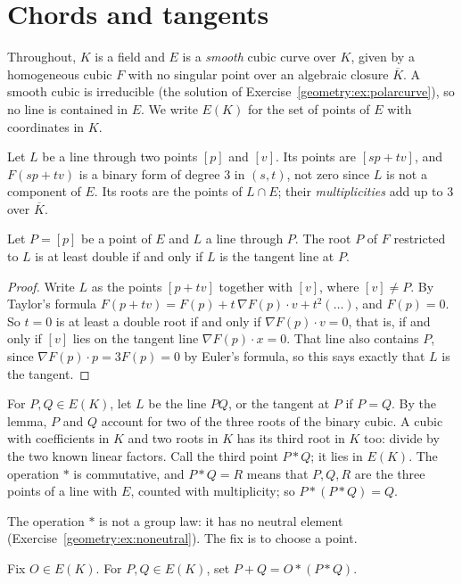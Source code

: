 \section{Chords and tangents}

Throughout, $K$ is a field and $E$ is a \emph{smooth} cubic curve over $K$, given by a homogeneous cubic $F$ with no singular point over an algebraic
closure $\overline K$. A smooth cubic is irreducible (the solution of Exercise~\ref{geometry:ex:polarcurve}), so no line is contained in $E$. We write $E(K)$ for the
set of points of $E$ with coordinates in $K$.

Let $L$ be a line through two points $[p]$ and $[v]$. Its points are $[sp+tv]$, and $F(sp+tv)$ is a binary form of degree $3$ in $(s,t)$, not zero since $L$ is
not a component of $E$. Its roots are the points of $L\cap E$; their \emph{multiplicities} add up to $3$ over $\overline K$.

\begin{lemma}\label{geometry:lem:tangentdouble}
Let $P=[p]$ be a point of $E$ and $L$ a line through $P$. The root $P$ of $F$ restricted to $L$ is at least double if and only if $L$ is the tangent line
at $P$.
\end{lemma}

\begin{proof}
Write $L$ as the points $[p+tv]$ together with $[v]$, where $[v]\ne P$. By Taylor's formula $F(p+tv)=F(p)+t\,\nabla F(p)\cdot v+t^2(\dots)$, and $F(p)=0$.
So $t=0$ is at least a double root if and only if $\nabla F(p)\cdot v=0$, that is, if and only if $[v]$ lies on the tangent line $\nabla F(p)\cdot x=0$.
That line also contains $P$, since $\nabla F(p)\cdot p=3F(p)=0$ by Euler's formula, so this says exactly that $L$ is the tangent.
\end{proof}

For $P,Q\in E(K)$, let $L$ be the line $PQ$, or the tangent at $P$ if $P=Q$. By the lemma, $P$ and $Q$ account for two of the three roots of the binary cubic.
A cubic with coefficients in $K$ and two roots in $K$ has its third root in $K$ too: divide by the two known linear factors. Call the third point $P*Q$; it
lies in $E(K)$. The operation $*$ is commutative, and $P*Q=R$ means that $P,Q,R$ are the three points of a line with $E$, counted with multiplicity; so
$P*(P*Q)=Q$.

The operation $*$ is not a group law: it has no neutral element (Exercise~\ref{geometry:ex:noneutral}). The fix is to choose a point.

\begin{definition}
Fix $O\in E(K)$. For $P,Q\in E(K)$, set $P+Q=O*(P*Q)$.
\end{definition}

